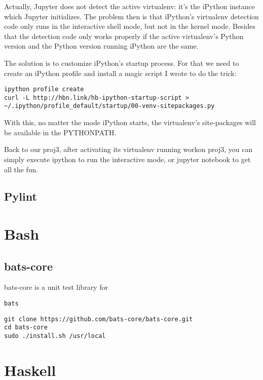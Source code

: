 \documentclass[11pt]{article}
\begin{document}
Actually, Jupyter does not detect the active virtualenv: it's the iPython instance which Jupyter initializes. The problem then is that iPython's virtualenv detection code only runs in the interactive shell mode, but not in the kernel mode. Besides that the detection code only works properly if the active virtualenv's Python version and the Python version running iPython are the same.

The solution is to customize iPython's startup process. For that we need to create an iPython profile and install a magic script I wrote to do the trick:

\begin{verbatim}
ipython profile create
curl -L http://hbn.link/hb-ipython-startup-script > ~/.ipython/profile_default/startup/00-venv-sitepackages.py
\end{verbatim}
With this, no matter the mode iPython starts, the virtualenv's site-packages will be available in the PYTHONPATH.

Back to our proj3, after activating its virtualenv running workon proj3, you can simply execute ipython to run the interactive mode, or jupyter notebook to get all the fun.

\subsection{Pylint}
\label{sec:org118d2fb}

\section{Bash}
\label{sec:orgff22841}

\subsection{bats-core}
\label{sec:orgf1d7bdf}
bats-core is a unit test library for 

\begin{verbatim}
bats
\end{verbatim}

\begin{verbatim}
git clone https://github.com/bats-core/bats-core.git
cd bats-core
sudo ./install.sh /usr/local
\end{verbatim}

\section{Haskell}
\label{sec:org6aa81d2}
\end{document}
